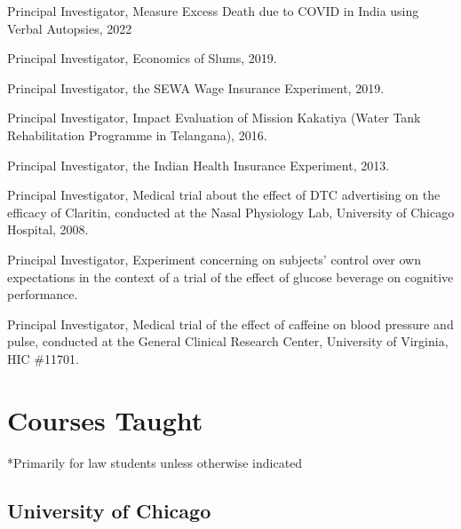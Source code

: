 \documentclass[11pt,letterpaper]{report}
\newcommand{\listitemspace}{0.25em}
\renewenvironment{itemize}
{\begin{list}{}{\setlength{\leftmargin}{0em}
                \setlength{\parskip}{0em}
                \setlength{\itemsep}{\listitemspace}
                \setlength{\parsep}{\listitemspace}}}
{\end{list}}
\begin{document}
    \begin{itemize}

        \item Principal Investigator, Measure Excess Death due to COVID in India using Verbal Autopsies, 2022
        \item Principal Investigator, Economics of Slums, 2019. 
        \item Principal Investigator, the SEWA Wage Insurance Experiment, 2019.
        \item Principal Investigator, Impact Evaluation of Mission Kakatiya (Water Tank Rehabilitation Programme in Telangana), 2016.
        \item Principal Investigator, the Indian Health Insurance Experiment, 2013.
        \item Principal Investigator, Medical trial about the effect of DTC advertising on the efficacy of Claritin, conducted at the Nasal Physiology Lab, University of Chicago Hospital, 2008.
        \item Principal Investigator, Experiment concerning on subjects’ control over own expectations in the context of a trial of the effect of glucose beverage on cognitive performance. 
        \item Principal Investigator, Medical trial of the effect of caffeine on blood pressure and pulse, conducted at the General Clinical Research Center, University of Virginia, HIC \#11701.

    \end{itemize}

    \section*{Courses Taught}

    *Primarily for law students unless otherwise indicated

    \subsection*{University of Chicago}
\end{document}
